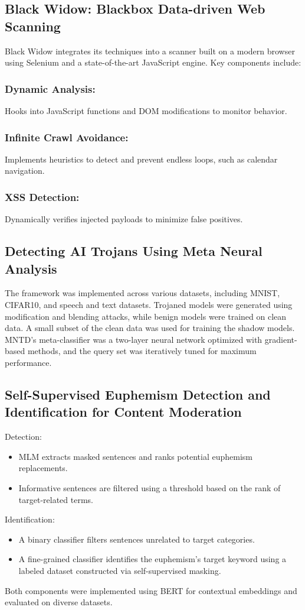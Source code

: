 \documentclass[conference]{IEEEtran}
\begin{document}
\subsection{\textbf{Black Widow: Blackbox Data-driven Web Scanning}}
Black Widow integrates its techniques into a scanner built on a modern browser using Selenium and a state-of-the-art JavaScript engine. Key components include:
\subsubsection{Dynamic Analysis:}
Hooks into JavaScript functions and DOM modifications to monitor behavior.
\subsubsection{Infinite Crawl Avoidance:}
Implements heuristics to detect and prevent endless loops, such as calendar navigation.
\subsubsection{XSS Detection:}
Dynamically verifies injected payloads to minimize false positives.
\subsection{\textbf{Detecting AI Trojans Using Meta Neural Analysis}}
The framework was implemented across various datasets, including MNIST, CIFAR10, and speech and text datasets. Trojaned models were generated using modification and blending attacks, while benign models were trained on clean data. A small subset of the clean data was used for training the shadow models. MNTD’s meta-classifier was a two-layer neural network optimized with gradient-based methods, and the query set was iteratively tuned for maximum performance.

\subsection{\textbf{Self-Supervised Euphemism Detection and Identification for Content Moderation}}
Detection:
\begin{itemize}
    \item 
MLM extracts masked sentences and ranks potential euphemism replacements.
\item
Informative sentences are filtered using a threshold based on the rank of target-related terms.
\end{itemize}
Identification:
\begin{itemize}
    \item 
A binary classifier filters sentences unrelated to target categories.
\item 
A fine-grained classifier identifies the euphemism's target keyword using a labeled dataset constructed via self-supervised masking.
\end{itemize}
Both components were implemented using BERT for contextual embeddings and evaluated on diverse datasets.
\end{document}
